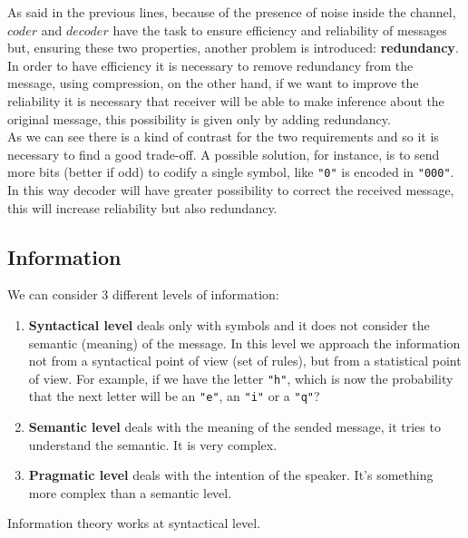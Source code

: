 As said in the previous lines, because of the presence of noise inside the channel, $coder$ and $decoder$ have the task to ensure efficiency and reliability of messages but, ensuring these two properties, another problem is introduced: \textbf{redundancy}.\\
In order to have efficiency it is necessary to remove redundancy from the message, using compression, on the other hand, if we want to improve the reliability it is necessary that receiver will be able to make inference about the original message, this possibility is given only by adding redundancy.\\
As we can see there is a kind of contrast for the two requirements and so it is necessary to find a good trade-off. A possible solution, for instance, is to send more bits (better if odd) to codify a single symbol, like \verb|"0"| is encoded in \verb|"000"|. In this way decoder will have greater possibility to correct the received message, this will increase reliability but also redundancy.

\subsection{Information}
We can consider 3 different levels of information:
\begin{enumerate}
	\item \textbf{Syntactical level} deals only with symbols and it does not consider the semantic (meaning) of the message. In this level we approach the information not from a syntactical point of view (set of rules), but from a statistical point of view. For example, if we have the letter \verb|"h"|, which is now the probability that the next letter will be an \verb|"e"|, an \verb|"i"| or a \verb|"q"|?
	\item \textbf{Semantic level} deals with the meaning of the sended message, it tries to understand the semantic. It is very complex.
	\item \textbf{Pragmatic level} deals with the intention of the speaker. It's something more complex than a semantic level.
\end{enumerate}
Information theory works at syntactical level.
\par \bigskip \noindent


